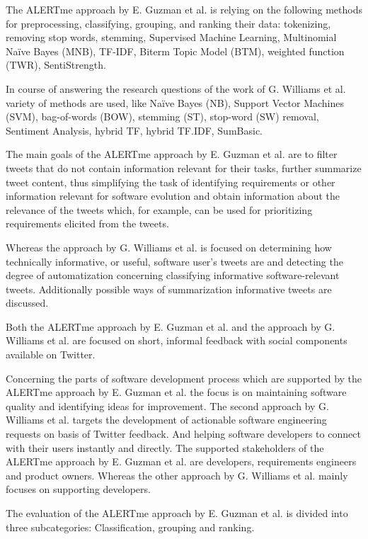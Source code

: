 \documentclass[a4paper,10pt, bibliography=totocnumbered]{scrreprt}
\begin{document}
The ALERTme approach by E. Guzman et al. \cite{Guzman} is relying on the following methods for preprocessing, classifying, grouping, and ranking their data: tokenizing, removing stop words, stemming, Supervised Machine Learning, Multinomial Naïve Bayes (MNB), TF-IDF, Biterm Topic Model (BTM), weighted function (TWR), SentiStrength. 

In course of answering the research questions of the work of G. Williams et al. \cite{Williams} variety of methods are used, like Naïve Bayes (NB), Support Vector Machines (SVM), bag-of-words (BOW), stemming (ST), stop-word (SW) removal, Sentiment Analysis, hybrid TF, hybrid TF.IDF, SumBasic.

The main goals of the ALERTme approach by E. Guzman et al. \cite{Guzman} are to filter tweets that do not contain information relevant for their tasks, further summarize tweet content, thus simplifying the task of identifying requirements or other information relevant for software evolution and obtain information about the relevance of the tweets which, for example, can be used for prioritizing requirements elicited from the tweets. 

Whereas the approach by G. Williams et al. \cite{Williams} is focused on determining how technically informative, or useful, software user’s tweets are and detecting the degree of automatization concerning classifying informative software-relevant tweets. Additionally possible ways of summarization informative tweets are discussed.


Both the ALERTme approach by E. Guzman et al. \cite{Guzman} and the approach by G. Williams et al. \cite{Williams} are focused on short, informal feedback with social components available on Twitter.


Concerning the parts of software development process which are supported by the ALERTme approach by E. Guzman et al. \cite{Guzman} the focus is on maintaining software quality and identifying ideas for improvement. The second approach by G. Williams et al. \cite{Williams} targets the development of actionable software engineering requests on basis of Twitter feedback. And helping software developers to connect with their users instantly and directly. The supported stakeholders of the ALERTme approach by E. Guzman et al. \cite{Guzman} are developers, requirements engineers and product owners. Whereas the other approach by G. Williams et al. \cite{Williams} mainly focuses on supporting developers.


The evaluation of the ALERTme approach by E. Guzman et al. \cite{Guzman} is divided into three subcategories: Classification, grouping and ranking. 
\end{document}
